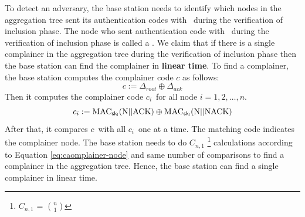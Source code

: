 		To detect an adversary, the base station needs to identify which nodes in the aggregation tree sent its authentication codes with \nack\ during the verification of inclusion phase.
		The node who sent authentication code with \nack\ during the verification of inclusion phase is called a \complainer. 
		We claim that if there is a single complainer in the aggregation tree during the verification of inclusion phase then the base station can find the complainer in \textbf{linear time}.
		To find a complainer, the base station computes the complainer code $c$ as follows:
		\begin{equation}
			\label{eq:complainer}
			c := \Delta_{root} \oplus \Delta_{ack}
		\end{equation}
		Then it computes the complainer code $c_{i}$\ for all node $i = 1, 2, \dotsc, n$. 
		\begin{equation}
			\label{eq:caomplainer-node}
			c_{i} := \mbox{MAC}_{\sf{sk}_{i}}(\mbox{N} || \mbox{ACK}) \oplus \mbox{MAC}_{\sf{sk}_{i}}(\mbox{N} || \mbox{NACK})
		\end{equation}
		After that, it compares $c$\ with all $c_{i}$\ one at a time. 
		The matching code indicates the complainer node.
		The base station needs to do $C_{n,1}$ \footnote{$C_{n,1}$ = $n \choose 1$} calculations according to Equation \ref{eq:caomplainer-node} and same number of comparisons to find a complainer in the aggregation tree. 
		Hence, the base station can find a single complainer in linear time.
